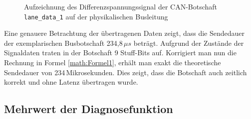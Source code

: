 \begin{figure}[!htbp]
	\centering

	\caption{Aufzeichnung des Differenzspannungssignal der CAN-Botschaft \texttt{lane\_data\_1} auf der physikalischen Busleitung}
	\label{abb:CAN_Scope_Datenreihe}
\end{figure}

Eine genauere Betrachtung der übertragenen Daten zeigt, dass die Sendedauer der exemplarischen Busbotschaft 234,8\,$\mu s$ beträgt. Aufgrund der Zustände der Signaldaten traten in der Botschaft 9 Stuff-Bits auf. Korrigiert man nun die Rechnung in Formel \ref{math:Formel1}, erhält man exakt die theoretische Sendedauer von 234\,Mikrosekunden. Dies zeigt, dass die Botschaft auch zeitlich korrekt und ohne Latenz übertragen wurde. 

\subsection{Mehrwert der Diagnosefunktion} \label{subsec:MehrwertDiagnose}

